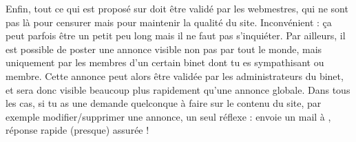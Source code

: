 Enfin, tout ce qui est propos\'e sur \fkz doit \^etre valid\'e par les
webmestres, qui ne sont pas l\`a  pour censurer mais pour maintenir la
qualit\'e du site. Inconv\'enient : \c ca peut parfois \^etre un petit peu
long mais il ne faut pas s'inqui\'eter. 
Par ailleurs, il est possible de poster une annonce visible non pas par tout le monde,
mais uniquement par les membres d'un certain binet dont tu es sympathisant ou membre.
Cette annonce peut alors \^etre valid\'ee par les administrateurs du binet, et sera donc visible 
beaucoup plus rapidement qu'une annonce globale.
Dans tous les cas, si tu as une demande quelconque \`a  faire sur le contenu du site, par exemple
modifier/supprimer une annonce, un seul r\'eflexe : envoie un mail \`a 
, r\'eponse rapide (presque) assur\'ee !


%
%
%
%
